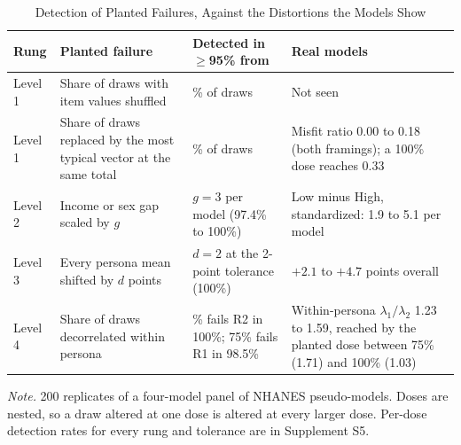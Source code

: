 \begin{table}[tp]
\centering
\caption{Detection of Planted Failures, Against the Distortions the Models Show}
\label{tab:s5dose}
\small
\setlength{\tabcolsep}{4pt}
\begin{tabular}{@{}l>{\raggedright\arraybackslash}p{4.1cm}>{\raggedright\arraybackslash}p{3.9cm}>{\raggedright\arraybackslash}p{4.4cm}@{}}
\toprule
Rung & Planted failure & Detected in $\ge$95\% from & Real models \\
\midrule
Level 1 & Share of draws with item values shuffled & 40\% of draws & Not seen \\
Level 1 & Share of draws replaced by the most typical vector at the same total & 80\% of draws & Misfit ratio 0.00 to 0.18 (both framings); a 100\% dose reaches 0.33 \\
Level 2 & Income or sex gap scaled by $g$ & $g = 3$ per model (97.4\% to 100\%) & Low minus High, standardized: 1.9 to 5.1 per model \\
Level 3 & Every persona mean shifted by $d$ points & $d = 2$ at the 2-point tolerance (100\%) & $+2.1$ to $+4.7$ points overall \\
Level 4 & Share of draws decorrelated within persona & 50\% fails R2 in 100\%; 75\% fails R1 in 98.5\% & Within-persona $\lambda_1/\lambda_2$ 1.23 to 1.59, reached by the planted dose between 75\% (1.71) and 100\% (1.03) \\
\bottomrule
\end{tabular}
\vspace{4pt}
\begin{tabnote}
\textit{Note.} 200 replicates of a four-model panel of NHANES pseudo-models. Doses are nested, so a draw altered at one dose is altered at every larger dose. Per-dose detection rates for every rung and tolerance are in Supplement S5. %
\end{tabnote}
\end{table}
